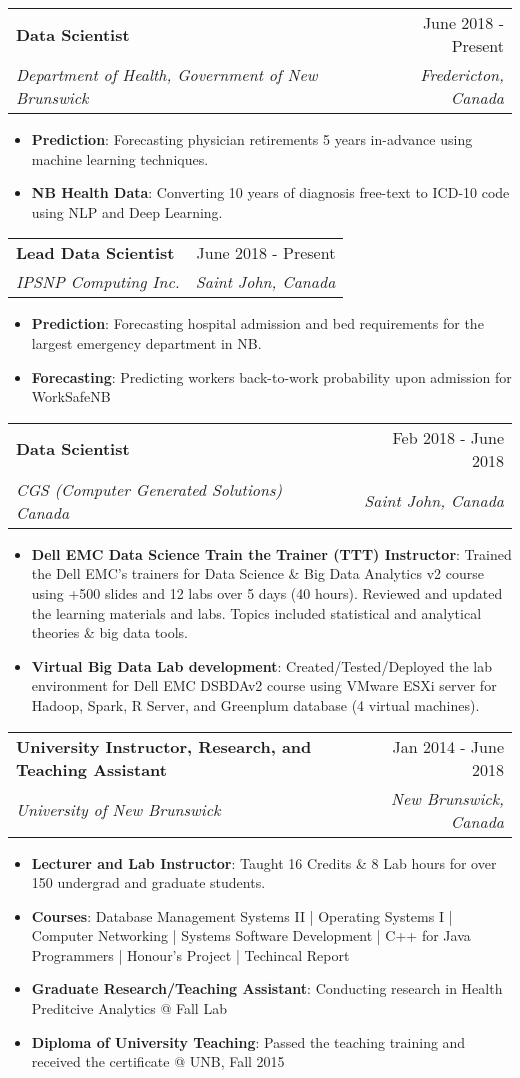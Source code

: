 \documentclass[letterpaper,11pt]{article}
\makeatletter
\newcommand{\resumeItem}[2]{
  \item\small{
    \textbf{#1}{: #2 \vspace{-2pt}}
  }
}
\newcommand{\resumeSubheading}[4]{
  \vspace{-1pt}\item
    \begin{tabular*}{0.97\textwidth}{l@{\extracolsep{\fill}}r}
      \textbf{#1} & #2 \\
      \textit{\small#3} & \textit{\small #4} \\
    \end{tabular*}\vspace{-5pt}
}
\newcommand{\resumeItemListStart}{\begin{itemize}}
\newcommand{\resumeItemListEnd}{\end{itemize}\vspace{-5pt}}
\makeatother
\begin{document}
    \resumeSubheading
          {Data Scientist}{June 2018 - Present}
      {Department of Health, Government of New Brunswick}{Fredericton, Canada}
      \resumeItemListStart
                \resumeItem{Prediction}
          {Forecasting physician retirements 5 years in-advance using machine learning techniques.}
        \resumeItem{NB Health Data}
          {Converting 10 years of diagnosis free-text to ICD-10 code using NLP and Deep Learning.}

      \resumeItemListEnd

    \resumeSubheading
          {Lead Data Scientist}{June 2018 - Present}
      {IPSNP Computing Inc.}{Saint John, Canada}
            \resumeItemListStart
          \resumeItem{Prediction}
          {Forecasting hospital admission and bed requirements for the largest emergency department in NB.}
        \resumeItem{Forecasting}
          {Predicting workers back-to-work probability upon admission for WorkSafeNB}
      \resumeItemListEnd
    \resumeSubheading
      {Data Scientist}{Feb 2018 - June 2018}
      {CGS (Computer Generated Solutions) Canada}{Saint John, Canada}
      \resumeItemListStart
        \resumeItem{Dell EMC Data Science Train the Trainer (TTT) Instructor}
          {Trained the Dell EMC's trainers for Data Science \& Big Data Analytics v2 course using +500 slides and 12 labs over 5 days (40 hours). Reviewed and updated the learning materials and labs. Topics included statistical and analytical theories \& big data tools.}
        \resumeItem{Virtual Big Data Lab development}
          {Created/Tested/Deployed the lab environment for Dell EMC DSBDAv2 course using VMware ESXi server for Hadoop, Spark, R Server, and Greenplum database (4 virtual machines).}
      \resumeItemListEnd

    \resumeSubheading
	  {University Instructor, Research, and Teaching Assistant}{Jan 2014 - June 2018}
      {University of New Brunswick}{New Brunswick, Canada}
      

      \resumeItemListStart
        \resumeItem{Lecturer and Lab Instructor}
          {Taught 16 Credits \& 8 Lab hours for over 150 undergrad and graduate students.} \resumeItem{Courses}{ Database Management Systems II | Operating Systems I | Computer Networking | Systems Software Development | C++ for Java Programmers | Honour's Project | Techincal Report}
                  \resumeItem{Graduate Research/Teaching Assistant}{Conducting research in Health Preditcive Analytics @ Fall Lab}
         \resumeItem{Diploma of University Teaching}
          {Passed the teaching training and received the certificate @ UNB, Fall 2015}
      \resumeItemListEnd
\end{document}
